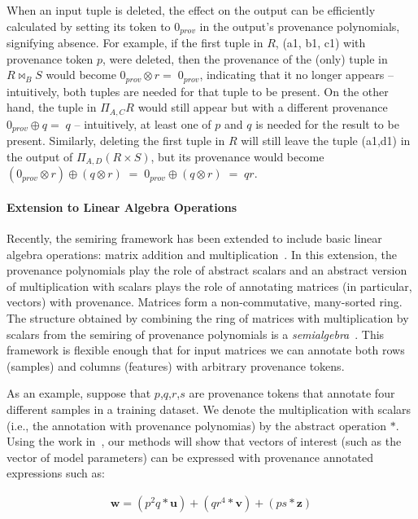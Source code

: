 \documentclass[11pt]{article}
\newcommand{\w}{\textbf{w}}
\renewcommand{\u}{\textbf{u}}
\renewcommand{\v}{\textbf{v}}
\newcommand{\z}{\textbf{z}}
\begin{document}
When an input tuple is deleted, the effect on the output can be efficiently calculated by setting its token to $0_{prov}$ in the output's provenance polynomials, signifying absence.  For example, if the first tuple in $R$, (a1, b1, c1) with provenance token $p$, were deleted, then the provenance of the (only) tuple in $R \bowtie_B S$ would become $0_{prov}\otimes r= \; 0_{prov}$, indicating that it no longer appears -- intuitively, both tuples are needed for that tuple to be present.  On the other hand, the tuple in $\Pi_{A, C}R$ would still appear but with a different provenance $0_{prov}\oplus q= \; q$ -- intuitively, at least one of $p$ and $q$ is needed for the result to be present. Similarly, deleting the first tuple in $R$ will still leave the tuple (a1,d1) in the output of $\Pi_{A, D} (R \times S)$, but its provenance would become $(0_{prov}\otimes r) \oplus (q\otimes r)\;=\; 0_{prov}\oplus (q\otimes r) \;=\; qr$.


\paragraph*{Extension to Linear Algebra Operations}
Recently, the semiring framework has been extended to include basic linear algebra operations: matrix
addition and multiplication~\cite{yan2016fine}. In this extension, the provenance polynomials play the role of abstract scalars and an abstract version of multiplication with scalars plays the role of annotating matrices (in particular, vectors) with provenance. Matrices form a non-commutative, many-sorted ring. The structure obtained by combining the ring of matrices with multiplication by scalars from the semiring of provenance polynomials is a \emph{semialgebra}~\cite{yan2016fine}.
This framework is flexible enough that for input matrices we can annotate both rows (samples)
and columns (features) with arbitrary provenance tokens.

As an example, suppose that $p$,$q$,$r$,$s$ are provenance tokens that annotate four different samples in a training dataset. We denote the multiplication with scalars (i.e., the annotation with provenance polynomias) by the abstract operation $*$. Using the work in~\cite{yan2016fine}, our methods will show that vectors of interest (such as the vector
of model parameters) can be expressed with provenance annotated expressions such as:
\begin{small}
\begin{align}\label{eq: w}
     \w = (p^2q*\u) + (qr^4*\v) + (ps*\z)
\end{align}
\end{small}
\end{document}
